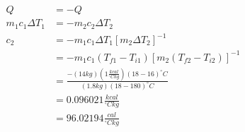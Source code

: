 \documentclass{article}
\begin{document}
\begin{align*}
    Q &= -Q \\
    m_1c_1\Delta T_1 &= -m_2c_2\Delta T_2 \\
    c_2 &= -m_1c_1\Delta T_1[m_2\Delta T_2]^{-1} \\
    &= -m_1c_1(T_{f1}-T_{i1})[m_2(T_{f2}-T_{i2})]^{-1} \\
    &= \frac{-(14kg)\left(1\frac{kcal}{^{\circ}Ckg}\right)(18-16)^{\circ}C}{(1.8kg)(18-180)^{\circ}C} \\
    &= 0.096021 \frac{kcal}{^{\circ}Ckg} \\
    &= 96.02194 \frac{cal}{^{\circ}Ckg}
    \end{align*}
\end{document}
